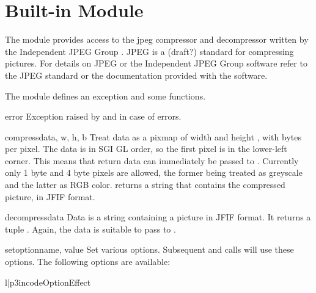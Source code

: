 \section{Built-in Module }
\label{module-jpeg}

The module  provides access to the jpeg compressor and
decompressor written by the Independent JPEG Group%
%
. JPEG is a (draft?)
standard for compressing pictures.  For details on JPEG or the
Independent JPEG Group software refer to the JPEG standard or the
documentation provided with the software.

The  module defines an exception and some functions.

\begin{excdesc}{error}
Exception raised by  and 
in case of errors.
\end{excdesc}

\begin{funcdesc}{compress}{data, w, h, b}
Treat data as a pixmap of width  and height , with
 bytes per pixel.  The data is in SGI GL order, so the first
pixel is in the lower-left corner. This means that 
return data can immediately be passed to .
Currently only 1 byte and 4 byte pixels are allowed, the former being
treated as greyscale and the latter as RGB color.
 returns a string that contains the compressed
picture, in JFIF format.
\end{funcdesc}

\begin{funcdesc}{decompress}{data}
Data is a string containing a picture in JFIF format. It
returns a tuple .  Again, the data is suitable to pass to
.
\end{funcdesc}

\begin{funcdesc}{setoption}{name, value}
Set various options.  Subsequent  and
 calls will use these options.  The following
options are available:

\begin{tableii}{l|p{3in}}{code}{Option}{Effect}
\end{tableii}
\end{funcdesc}
